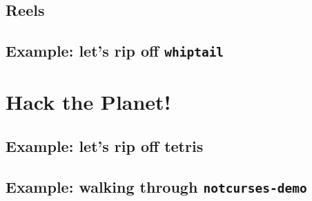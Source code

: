 \documentclass[letterpaper,10pt]{article}
\begin{document}
\subsection{Reels}
\subsection{Example: let's rip off \texttt{whiptail}}

\section{Hack the Planet!}
\subsection{Example: let's rip off tetris}
\label{section:casestudy}
\subsection{Example: walking through \texttt{notcurses-demo}}

\newpage
\end{document}
